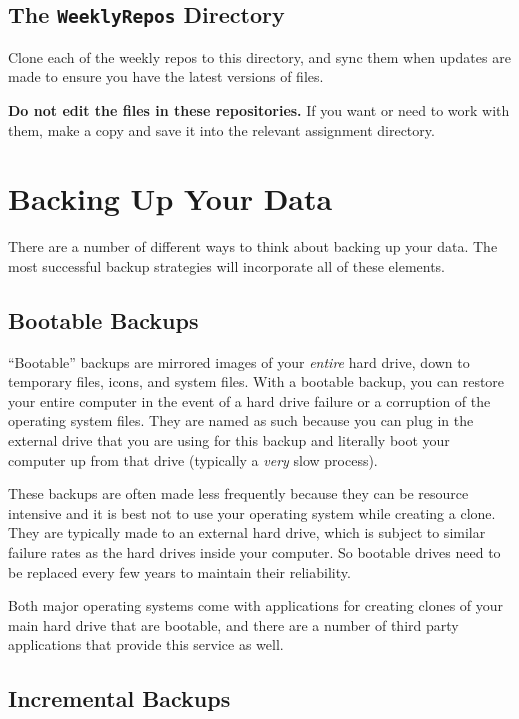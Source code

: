 \documentclass[]{book}
\begin{document}
\subsection{\texorpdfstring{The \texttt{WeeklyRepos}
Directory}{The WeeklyRepos Directory}}\label{the-weeklyrepos-directory}

Clone each of the weekly repos to this directory, and sync them when
updates are made to ensure you have the latest versions of files.

\textbf{Do not edit the files in these repositories.} If you want or
need to work with them, make a copy and save it into the relevant
assignment directory.

\section{Backing Up Your Data}\label{backing-up-your-data}

There are a number of different ways to think about backing up your
data. The most successful backup strategies will incorporate all of
these elements.

\subsection{Bootable Backups}\label{bootable-backups}

``Bootable'' backups are mirrored images of your \emph{entire} hard
drive, down to temporary files, icons, and system files. With a bootable
backup, you can restore your entire computer in the event of a hard
drive failure or a corruption of the operating system files. They are
named as such because you can plug in the external drive that you are
using for this backup and literally boot your computer up from that
drive (typically a \emph{very} slow process).

These backups are often made less frequently because they can be
resource intensive and it is best not to use your operating system while
creating a clone. They are typically made to an external hard drive,
which is subject to similar failure rates as the hard drives inside your
computer. So bootable drives need to be replaced every few years to
maintain their reliability.

Both major operating systems come with applications for creating clones
of your main hard drive that are bootable, and there are a number of
third party applications that provide this service as well.

\subsection{Incremental Backups}\label{incremental-backups}
\end{document}
